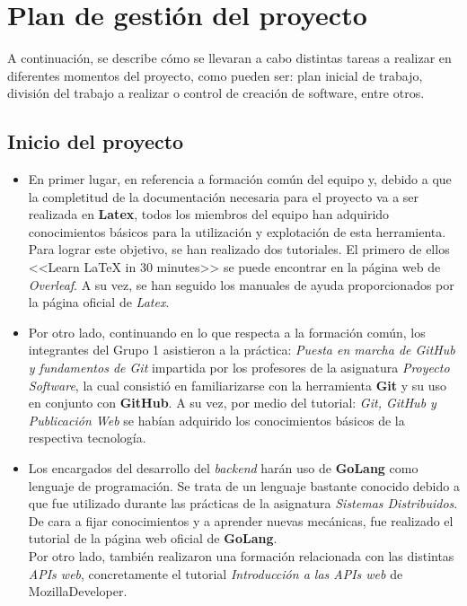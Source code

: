 \documentclass[11pt, a4paper, titlepage]{article}
\begin{document}
\section{Plan de gestión del proyecto}

A continuación, se describe cómo se llevaran a cabo distintas tareas a realizar en diferentes momentos del proyecto, como pueden ser: plan inicial de trabajo, división del trabajo a realizar o control de creación de software, entre otros.

\subsection{Inicio del proyecto}

\begin{itemize}

\item En primer lugar, en referencia a formación común del equipo y, debido a que la completitud de la documentación necesaria para el proyecto va a ser realizada en \textbf{Latex}, todos los miembros del equipo han adquirido conocimientos básicos para la utilización y explotación de esta herramienta. Para lograr este objetivo, se han realizado dos tutoriales. El primero de ellos <<Learn LaTeX in 30 minutes>>\textsuperscript{\cite{latextutorial1} }se puede encontrar en la página web de \textit{Overleaf}. A su vez, se han seguido los manuales de ayuda proporcionados por la página oficial de \textit{Latex}\textsuperscript{\cite{latextutorial2}}. 

\item Por otro lado, continuando en lo que respecta a la formación común, los integrantes del Grupo 1 asistieron a la práctica: \textit{Puesta en marcha de GitHub y fundamentos de Git} impartida por los profesores de la asignatura \textit{Proyecto Software}, la cual consistió en familiarizarse con la herramienta \textbf{Git} y su uso en conjunto con \textbf{GitHub}. A su vez, por medio del tutorial: \textit{Git, GitHub y Publicación Web}\textsuperscript{\cite{githubtutorial}} se habían adquirido los conocimientos básicos de la respectiva tecnología.

\item Los encargados del desarrollo del \textit{backend} harán uso de \textbf{GoLang} como lenguaje de programación. Se trata de un lenguaje bastante conocido debido a que fue utilizado durante las prácticas de la asignatura \textit{Sistemas Distribuidos}. De cara a fijar conocimientos y a aprender nuevas mecánicas, fue realizado el tutorial de la página web oficial de \textbf{GoLang}. \\
Por otro lado, también realizaron una formación relacionada con las distintas \textit{APIs web}, concretamente el tutorial \textit{Introducción a las APIs web} de MozillaDeveloper\textsuperscript{\cite{apisweb}}.


\end{itemize}
\end{document}
